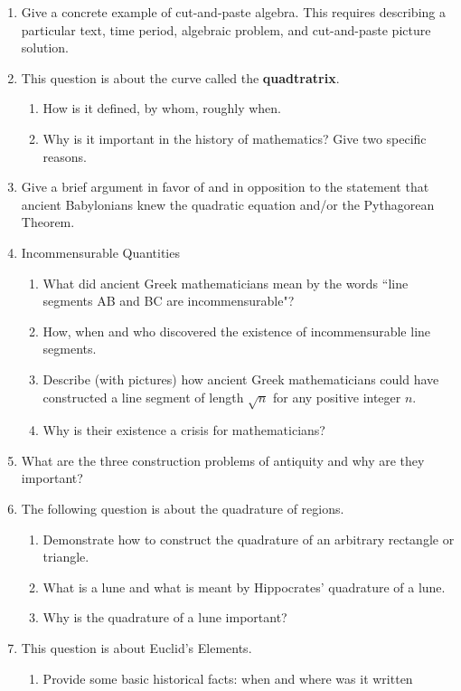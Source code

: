 \documentclass[12pt]{article}
\begin{document}
\begin{enumerate}
\begin{enumerate}
	\end{enumerate}
\item Give a concrete example of cut-and-paste algebra. This requires describing a particular text, time period, algebraic problem, and cut-and-paste picture solution.
\item This question is about the curve called the \textbf{quadtratrix}.
	\begin{enumerate}
	\item How is it defined, by whom, roughly when.
	\item Why is it important in the history of mathematics? Give two specific reasons.
	\end{enumerate}
\item Give a brief argument in favor of and in opposition to the statement that ancient Babylonians knew the quadratic equation and/or the Pythagorean Theorem.
\item Incommensurable Quantities
	\begin{enumerate}
	\item What did ancient Greek mathematicians mean by the words ``line segments AB and BC are incommensurable"?
	\item How, when and who discovered the existence of incommensurable line segments. 
	\item Describe (with pictures) how ancient Greek mathematicians could have constructed a line segment of length $\sqrt{n}$ for any positive integer $n.$
	\item Why is their existence a crisis for mathematicians?
	\end{enumerate}
\item What are the three construction problems of antiquity and why are they important?
\item The following question is about the quadrature of regions.
	\begin{enumerate}
	\item Demonstrate how to construct the quadrature of an arbitrary rectangle or triangle.
	\item What is a lune and what is meant by Hippocrates' quadrature of a lune.
	\item Why is the quadrature of a lune important?
	\end{enumerate}
\item This question is about Euclid's Elements.
	\begin{enumerate}
	\item Provide some basic historical facts: when and where was it written

\end{enumerate}
\end{enumerate}
\end{document}
